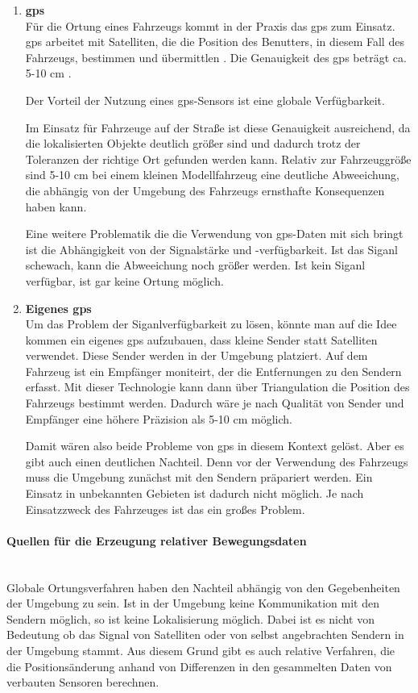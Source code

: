 \begin{enumerate}[leftmargin=*]
    \item \textbf{\acf{gps}} \\
    Für die Ortung eines Fahrzeugs kommt in der Praxis das \ac{gps} zum Einsatz. 
    \ac{gps} arbeitet mit Satelliten, die die Position des Benutters, in diesem Fall des Fahrzeugs, bestimmen und übermittlen \cite{ashby2003relativity}. 
    Die Genauigkeit des \ac{gps} beträgt ca. 5-10 cm \cite{ashby2003relativity}.

    Der Vorteil der Nutzung eines \ac{gps}-Sensors ist eine globale Verfügbarkeit.

    Im Einsatz für Fahrzeuge auf der Straße ist diese Genauigkeit ausreichend, 
    da die lokalisierten Objekte deutlich größer sind und dadurch trotz der Toleranzen der richtige Ort gefunden werden kann.
    Relativ zur Fahrzeuggröße sind 5-10 cm bei einem kleinen Modellfahrzeug eine deutliche Abweeichung, die abhängig von der Umgebung des Fahrzeugs ernsthafte Konsequenzen haben kann.

    Eine weitere Problematik die die Verwendung von \ac{gps}-Daten mit sich bringt ist die Abhängigkeit von der Signalstärke und -verfügbarkeit. 
    Ist das Siganl schewach, kann die Abweeichung noch größer werden. 
    Ist kein Siganl verfügbar, ist gar keine Ortung möglich.
    
    \item \textbf{Eigenes \ac{gps}} \\
    Um das Problem der Siganlverfügbarkeit zu lösen, könnte man auf die Idee kommen ein eigenes \acf{gps} aufzubauen, dass kleine Sender statt Satelliten verwendet.
    Diese Sender werden in der Umgebung platziert. 
    Auf dem Fahrzeug ist ein Empfänger moniteirt, der die Entfernungen zu den Sendern erfasst.
    Mit dieser Technologie kann dann über Triangulation die Position des Fahrzeugs bestimmt werden. 
    Dadurch wäre je nach Qualität von Sender und Empfänger eine höhere Präzision als 5-10 cm möglich. 
    
    Damit wären also beide Probleme von \ac{gps} in diesem Kontext gelöst. 
    Aber es gibt auch einen deutlichen Nachteil. 
    Denn vor der Verwendung des Fahrzeugs muss die Umgebung zunächst mit den Sendern präpariert werden. 
    Ein Einsatz in unbekannten Gebieten ist dadurch nicht möglich. 
    Je nach Einsatzzweck des Fahrzeuges ist das ein großes Problem.
\end{enumerate}

\paragraph{Quellen für die Erzeugung relativer Bewegungsdaten} \mbox{}\\
Globale Ortungsverfahren haben den Nachteil abhängig von den Gegebenheiten der Umgebung zu sein.
Ist in der Umgebung keine Kommunikation mit den Sendern möglich, so ist keine Lokalisierung möglich.
Dabei ist es nicht von Bedeutung ob das Signal von Satelliten oder von selbst angebrachten Sendern in der Umgebung stammt.
Aus diesem Grund gibt es auch relative Verfahren, die die Positionsänderung anhand von Differenzen in den gesammelten Daten von verbauten Sensoren berechnen.

